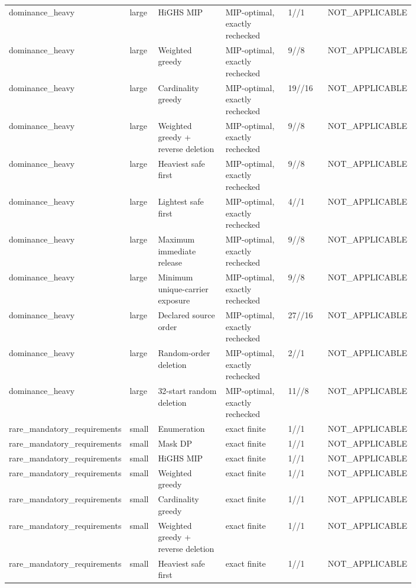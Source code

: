 {\begin{longtable}{p{0.18\linewidth}p{0.07\linewidth}p{0.17\linewidth}p{0.16\linewidth}p{0.10\linewidth}p{0.12\linewidth}}
dominance\_heavy & large & HiGHS MIP & MIP-optimal, exactly rechecked & 1//1 & NOT\_APPLICABLE \\
dominance\_heavy & large & Weighted greedy & MIP-optimal, exactly rechecked & 9//8 & NOT\_APPLICABLE \\
dominance\_heavy & large & Cardinality greedy & MIP-optimal, exactly rechecked & 19//16 & NOT\_APPLICABLE \\
dominance\_heavy & large & Weighted greedy + reverse deletion & MIP-optimal, exactly rechecked & 9//8 & NOT\_APPLICABLE \\
dominance\_heavy & large & Heaviest safe first & MIP-optimal, exactly rechecked & 9//8 & NOT\_APPLICABLE \\
dominance\_heavy & large & Lightest safe first & MIP-optimal, exactly rechecked & 4//1 & NOT\_APPLICABLE \\
dominance\_heavy & large & Maximum immediate release & MIP-optimal, exactly rechecked & 9//8 & NOT\_APPLICABLE \\
dominance\_heavy & large & Minimum unique-carrier exposure & MIP-optimal, exactly rechecked & 9//8 & NOT\_APPLICABLE \\
dominance\_heavy & large & Declared source order & MIP-optimal, exactly rechecked & 27//16 & NOT\_APPLICABLE \\
dominance\_heavy & large & Random-order deletion & MIP-optimal, exactly rechecked & 2//1 & NOT\_APPLICABLE \\
dominance\_heavy & large & 32-start random deletion & MIP-optimal, exactly rechecked & 11//8 & NOT\_APPLICABLE \\
rare\_mandatory\_requirements & small & Enumeration & exact finite & 1//1 & NOT\_APPLICABLE \\
rare\_mandatory\_requirements & small & Mask DP & exact finite & 1//1 & NOT\_APPLICABLE \\
rare\_mandatory\_requirements & small & HiGHS MIP & exact finite & 1//1 & NOT\_APPLICABLE \\
rare\_mandatory\_requirements & small & Weighted greedy & exact finite & 1//1 & NOT\_APPLICABLE \\
rare\_mandatory\_requirements & small & Cardinality greedy & exact finite & 1//1 & NOT\_APPLICABLE \\
rare\_mandatory\_requirements & small & Weighted greedy + reverse deletion & exact finite & 1//1 & NOT\_APPLICABLE \\
rare\_mandatory\_requirements & small & Heaviest safe first & exact finite & 1//1 & NOT\_APPLICABLE \\

\end{longtable}}
